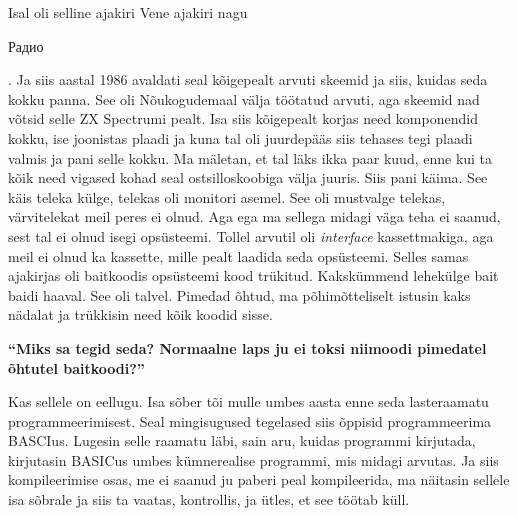 Isal  oli selline ajakiri Vene ajakiri nagu 
\begin{russian}Радио\end{russian}. Ja siis aastal 1986 avaldati seal 
kõigepealt arvuti skeemid ja siis, kuidas seda kokku panna. See oli 
Nõukogudemaal välja töötatud arvuti, aga skeemid nad võtsid selle ZX Spectrumi 
pealt. Isa siis kõigepealt korjas need komponendid kokku, ise 
joonistas plaadi ja kuna tal oli juurdepääs siis tehases tegi plaadi valmis ja 
pani selle kokku. Ma mäletan, et tal läks ikka paar kuud, enne kui ta kõik need 
vigased kohad seal ostsilloskoobiga välja juuris. Siis pani käima. See käis 
teleka  külge,  telekas oli monitori asemel. See oli mustvalge telekas, 
värvitelekat  meil peres ei olnud.  Aga ega ma sellega  midagi väga teha ei 
saanud, sest tal ei olnud isegi opsüsteemi. Tollel arvutil oli \emph{interface} 
kassettmakiga, aga meil ei olnud ka kassette, mille pealt laadida seda 
opsüsteemi. Selles samas ajakirjas oli baitkoodis opsüsteemi kood trükitud. 
Kakskümmend lehekülge bait baidi haaval. See oli talvel. Pimedad õhtud, ma 
põhimõtteliselt istusin kaks nädalat ja trükkisin need kõik koodid sisse.

\textbf{\enquote{Miks sa tegid seda? Normaalne laps ju ei toksi niimoodi 
pimedatel õhtutel baitkoodi?}}

Kas sellele on eellugu. Isa sõber tõi mulle umbes aasta enne seda lasteraamatu  
programmeerimisest. Seal  mingisugused  tegelased siis õppisid programmeerima 
BASCIus. Lugesin selle raamatu läbi, sain aru, kuidas 
programmi kirjutada, kirjutasin BASICus umbes kümnerealise programmi, mis 
midagi arvutas. Ja siis kompileerimise osas, me ei saanud ju paberi peal
kompileerida, ma näitasin sellele isa sõbrale ja siis ta vaatas, kontrollis,  
ja ütles, et see töötab küll.


